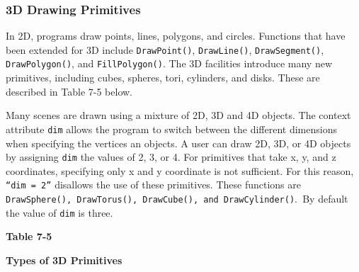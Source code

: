 \subsubsection{3D Drawing Primitives}

In 2D, programs draw points, lines, polygons, and circles. Functions
that have been extended for 3D include
\texttt{DrawPoint()}, \texttt{DrawLine()}, \texttt{DrawSegment()},
\texttt{DrawPolygon()}, and \texttt{FillPolygon()}. The 3D facilities
introduce many new primitives, including cubes, spheres, tori,
cylinders, and disks. These are described in Table 7-5 below.

Many scenes are drawn using a mixture of 2D, 3D and 4D objects. The
context attribute \texttt{dim} allows the program to switch between the
different dimensions when specifying the vertices an objects. A user
can draw 2D, 3D, or 4D objects by assigning \texttt{dim} the values of
2, 3, or 4. For primitives that take x, y, and z coordinates,
specifying only x and y coordinate is not sufficient. For this reason,
\texttt{{\textquotedblleft}dim = 2{\textquotedblright}} disallows the
use of these primitives. These functions are
\texttt{DrawSphere()}\texttt{, }\texttt{DrawTorus()}\texttt{,
}\texttt{DrawCube()}\texttt{, and }\texttt{DrawCylinder()}.\texttt{ }By
default the value of \texttt{dim} is three.

\bigskip

{\centering\sffamily\bfseries
Table 7-5
\par}

{\centering\sffamily\bfseries
Types of 3D Primitives
\par}

